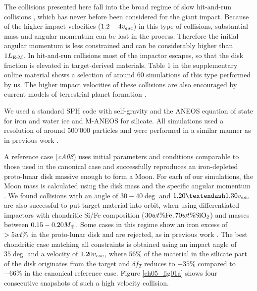 The collisions presented here fall into the broad regime of slow hit-and-run collisions \citep{Asphaug:2006p3729}, which has never before been considered for the giant impact. Because of the higher impact velocities ($1.2-4 v_{esc}$) in this type of collisions, substantial mass and angular momentum can be lost in the process. Therefore the initial angular momentum is less constrained and can be considerably higher than $1 L_{\textrm{E-M}}$. In hit-and-run collisions most of the impactor escapes, so that the disk fraction is elevated in target-derived materials. Table 1 in the supplementary online material shows a selection of around 60 simulations of this type performed by us. The higher impact velocities of these collisions are also encouraged by current models of terrestrial planet formation \citep{2006Icar..184...39O}. 

We used a standard SPH code with self-gravity and the ANEOS equation of state \citep{1972Thompson} for iron and water ice and M-ANEOS  \citep{Melosh:2007p3502} for silicate. All simulations used a resolution of around 500'000 particles and were performed in a similar manner as in previous work \citep{Benz:1985p1755, Canup:2001p1861, Canup:2001p3295, Canup:2004p115}. 

A reference case (\emph{cA08}) uses initial parameters and conditions comparable to those used in the canonical case \citep{Canup:2004p115} and successfully reproduces an iron-depleted proto-lunar disk massive enough to form a Moon. For each of our simulations, the Moon mass is calculated using the disk mass and the specific angular momentum \citep{Kokubo:2000p2195}. We found collisions with an angle of $30-40\deg$ and $1.20 – 1.30 \vesc$ are also successful to put target material into orbit, when using differentiated impactors with chondritic Si/Fe composition ($30 wt\mathrm{\%} \textrm{Fe}, 70 wt\mathrm{\%} \mathrm{SiO}_2$) and masses between $0.15-0.20 M_{\oplus}$. Some cases in this regime show an iron excess of $> 5 wt\mathrm{\%}$ in the proto-lunar disk and are rejected, as in previous work \citep{Canup:2004p115}. The best chondritic case matching all constraints is obtained using an impact angle of $35 \deg$ and a velocity of $1.20 v_{esc}$, where $56\%$ of the material in the silicate part of the disk originates from the target and $\delta f_{T}$ reduces to $-35\%$ compared to $-66\%$ in the canonical reference case. Figure \ref{ch05_fig01a} shows four consecutive snapshots of such a high velocity collision.

